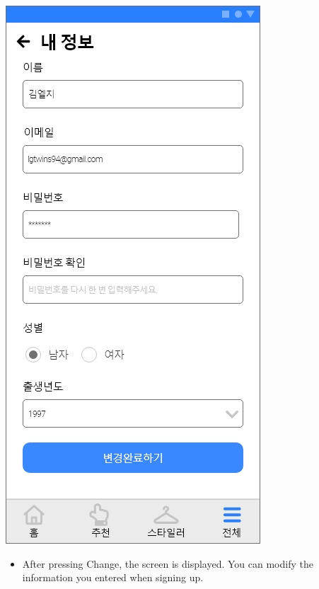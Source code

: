 \documentclass[conference]{IEEEtran}
\begin{document}
\begin{enumerate}
    \centerline{\includegraphics[scale=0.32]{assets/내 정보2.jpg}}
    \begin{itemize}
    \item[] After pressing Change, the screen is displayed. You can modify the information you entered when signing up. \\ \\
    \end{itemize}
    
    \break
    

\end{enumerate}
\end{document}
